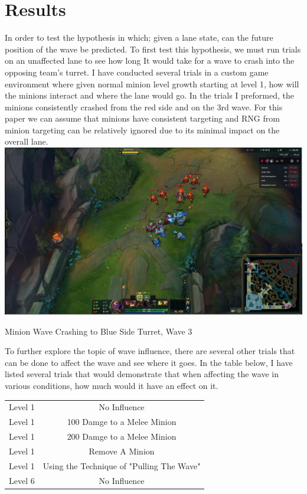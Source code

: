 \documentclass{article}
\begin{document}
\section{Results}
\begin{table}[h]
In order to test the hypothesis in which; given a lane state, can the future position of the wave be predicted. To first test this hypothesis, we must run trials on an unaffected lane to see how long It would take for a wave to crash into the opposing team’s turret. I have conducted several trials in a custom game environment where given normal minion level growth starting at level 1, how will the minions interact and where the lane would go. In the trials I preformed, the minions consistently crashed from the red side and on the 3rd wave. For this paper we can assume that minions have consistent targeting and RNG from minion targeting can be relatively ignored due to its minimal impact on the overall lane. 
\includegraphics[width=\textwidth]{Crash.PNG}
\caption[Minion Wave Crashing to Blue Side Turret]{Minion Wave Crashing to Blue Side Turret, Wave 3}
\end{table}
To further explore the topic of wave influence, there are several other trials that can be done to affect the wave and see where it goes. In the table below, I have listed several trials that would demonstrate that when affecting the wave in various conditions, how much would it have an effect on it.
\begin{center}

\begin{tabular}{ c c }
  Level 1 & No Influence \\ 
  Level 1 & 100 Damge to  a Melee Minion \\  
  Level 1 & 200 Damge to  a Melee Minion \\  
  Level 1 & Remove A Minion \\  
  Level 1 & Using the Technique of "Pulling The Wave"  \\
  Level 6 & No Influence  
 \end{tabular}
\end{center}
\end{document}

